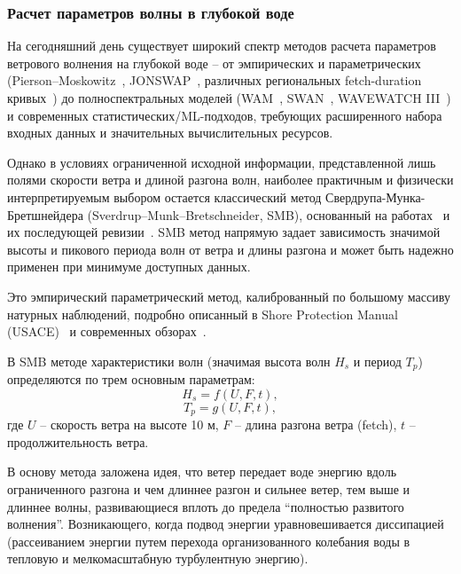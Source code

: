 
\subsubsection{Расчет параметров волны в глубокой воде}
\label{sec:deep_whater_wave}

На сегодняшний день существует широкий спектр методов расчета параметров ветрового волнения на глубокой воде -- от эмпирических и параметрических (Pierson–Moskowitz~\cite{pierson_moskowitz_1964}, JONSWAP~\cite{hasselmann_jonswap_1973}, различных региональных fetch-duration кривых~\cite{cerc_spm_1984, shore_fetch_duration_report}) до полноспектральных моделей (WAM~\cite{wamdi_group_1988, ecmwf_wam_doc_2016}, SWAN~\cite{booij_swan_1999}, WAVEWATCH III~\cite{tolman_ww3_2009}) и современных статистических/ML-подходов, требующих расширенного набора входных данных и значительных вычислительных ресурсов. 

Однако в условиях ограниченной исходной информации, представленной лишь полями скорости ветра и длиной разгона волн, наиболее практичным и физически интерпретируемым выбором остается классический метод Свердрупа-Мунка-Бретшнейдера (Sverdrup–Munk–Bretschneider, SMB), основанный на работах~\cite{sverdrup_munk_1947,sverdrup_munk_1947_tagu} и их последующей ревизии~\cite{bretschneider_1958}.
SMB метод напрямую задает зависимость значимой высоты и пикового периода волн от ветра и длины разгона и может быть надежно применен при минимуме доступных данных.

Это эмпирический параметрический метод, калиброванный по большому массиву натурных наблюдений, подробно описанный в Shore Protection Manual (USACE)~\cite{cerc_spm_1984} и современных обзорах~\cite{aisjah2016smb_java_sea, palmieri_2022_from_wind_to_wave}.

В SMB методе характеристики волн (значимая высота волн $H_s$ и период $T_p$) определяются по трем основным параметрам:
\begin{equation}
  H_s = f(U, F, t),
\end{equation}
\begin{equation}
  T_p = g(U, F, t),
\end{equation}
где \(U\) -- скорость ветра на высоте 10 м,
\(F\) -- длина разгона ветра (fetch), \(t\) -- продолжительность ветра.

В основу метода заложена идея, что ветер передает воде энергию вдоль ограниченного разгона и чем длиннее разгон и сильнее ветер, тем выше и длиннее волны, развивающиеся вплоть до предела \enquote{полностью развитого волнения}.
Возникающего, когда подвод энергии уравновешивается диссипацией (рассеиванием энергии путем перехода организованного колебания воды в тепловую и мелкомасштабную турбулентную энергию).

